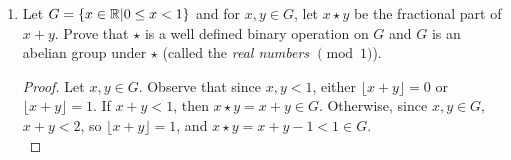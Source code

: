 \begin{enumerate}
\begin{sln}
\begin{enumerate}
\begin{proof}
					\end{proof}
				\item This is not a group.
					\begin{proof}
						We will show the group is not closed under the operation.
						\[\frac{1}{3} + \frac{1}{2} = \frac{5}{6}\notin G\]
					\end{proof}
			\end{enumerate}
		\end{sln}
		\item Let $G=\left\{x\in\mathbb{R}|0\leq x<1 \right\}$ and for $x,y\in G$, let $x\star y$ be the fractional part of $x+y$.  Prove that $\star$ is a well defined binary operation on $G$ and $G$ is an abelian group under $\star$ (called the \emph{real numbers $\pmod 1$}).
		\begin{proof}
			Let $x,y\in G$.  Observe that since $x,y<1$, either $\lfloor x+y \rfloor = 0$ or $\lfloor x+y \rfloor =1$.  If $x+y<1$, then $x\star y = x+y \in G$.  Otherwise, since $x,y\in G$, $x+y<2$, so $\lfloor x+y \rfloor = 1$, and $x\star y = x+y - 1 <1 \in G$.\\
			

\end{proof}
\end{enumerate}
